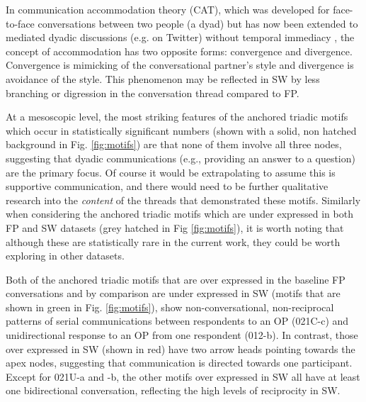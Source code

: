 In communication accommodation theory (CAT)\cite{coupland_introduction_1988}, which was developed for face-to-face conversations between two people (a dyad) but has now been extended to mediated dyadic discussions (e.g. on Twitter) without temporal immediacy \cite{lipinski-harten_comparison_2012}, the concept of accommodation has two opposite forms: convergence and divergence.  Convergence is mimicking of the conversational partner's style and divergence is avoidance of the style. This phenomenon may be reflected in SW by less branching or digression in the conversation thread compared to FP.

At a mesoscopic level, the most striking features of the anchored triadic motifs which occur in statistically significant numbers (shown with a solid, non hatched background in Fig. \ref{fig:motifs}) are that none of them involve all three nodes, suggesting that dyadic communications (e.g., providing an answer to a question) are the primary focus.  Of course it would be extrapolating to assume this is supportive communication, and there would need to be further qualitative research into the \textit{content} of the threads that demonstrated these motifs.  Similarly when considering the anchored triadic motifs which are under expressed in both FP and SW datasets (grey hatched in Fig \ref{fig:motifs}), it is worth noting that although these are statistically rare in the current work, they could be worth exploring in other datasets.

Both of the anchored triadic motifs that are over expressed in the baseline FP conversations and by comparison are under expressed in SW (motifs that are shown in green in Fig. \ref{fig:motifs}), show non-conversational, non-reciprocal patterns of serial communications between respondents to an OP (021C-c) and unidirectional response to an OP from one respondent (012-b). In contrast, those over expressed in SW (shown in red) have two arrow heads pointing towards the apex nodes, suggesting that communication is directed towards one participant. Except for 021U-a and -b, the other motifs over expressed in SW all have at least one bidirectional conversation, reflecting the high levels of reciprocity in SW. 


